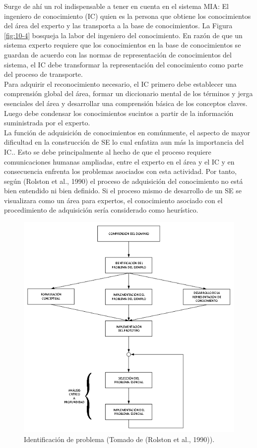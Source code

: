 Surge de ahí un rol indispensable a tener en cuenta en el sistema MIA: El ingeniero de conocimiento (IC) quien es la persona que obtiene los conocimientos del área del experto y las transporta a la base de conocimientos. La Figura \ref{fig:10-4} bosqueja la labor del ingeniero del conocimiento. En razón de que un sistema experto requiere que los conocimientos en la base de conocimientos se guardan de acuerdo con las normas de representación de conocimientos del sistema, el IC debe transformar la representación del conocimiento como parte del proceso de transporte.\\
Para adquirir el reconocimiento necesario, el IC primero debe establecer una comprensión global del área, formar un diccionario mental de los términos y jerga esenciales del área y desarrollar una comprensión básica de los conceptos claves. Luego debe condensar los conocimientos sucintos a partir de la información suministrada por el experto.\\
La función de adquisición de conocimientos en comúnmente, el aspecto de mayor dificultad en la construcción de SE lo cual enfatiza aun más la importancia del IC.. Esto se debe principalmente al hecho de que el proceso requiere comunicaciones humanas ampliadas, entre el experto en el área y el IC y en consecuencia enfrenta los problemas asociados con esta actividad. Por tanto, según (Rolston et al., 1990)  el proceso de adquisición del conocimiento no está bien entendido ni bien definido. Si el proceso mismo de desarrollo de un SE se visualizara como un área para expertos, el conocimiento asociado con el procedimiento de adquisición sería considerado como heurístico.\\
\begin{figure}[H]
\centering
\captionsetup{justification=centering,margin=2cm}
\includegraphics[scale=1]{chapters/chapter10/figures/10-3}
\caption{Identificación de problema (Tomado de (Rolston et al., 1990)).}
\label{fig:10-3}
\end{figure}
